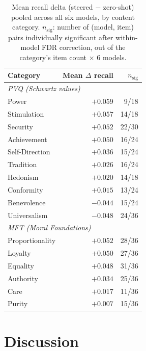 \begin{table}[t]
\centering
\caption{Mean recall delta (steered $-$ zero-shot) pooled across all six models, by
content category. $n_{\text{sig}}$: number of (model, item) pairs individually
significant after within-model FDR correction, out of the category's item count
$\times$ 6 models.}
\label{tab:category-patterns}
\begin{tabular}{lrr}
\toprule
Category & Mean $\Delta$ recall & $n_{\text{sig}}$ \\
\midrule
\multicolumn{3}{l}{\emph{PVQ (Schwartz values)}} \\
Power           & $+0.059$ & 9/18 \\
Stimulation     & $+0.057$ & 14/18 \\
Security        & $+0.052$ & 22/30 \\
Achievement     & $+0.050$ & 16/24 \\
Self-Direction  & $+0.036$ & 15/24 \\
Tradition       & $+0.026$ & 16/24 \\
Hedonism        & $+0.020$ & 14/18 \\
Conformity      & $+0.015$ & 13/24 \\
Benevolence     & $-0.044$ & 15/24 \\
Universalism    & $-0.048$ & 24/36 \\
\midrule
\multicolumn{3}{l}{\emph{MFT (Moral Foundations)}} \\
Proportionality & $+0.052$ & 28/36 \\
Loyalty         & $+0.050$ & 27/36 \\
Equality        & $+0.048$ & 31/36 \\
Authority       & $+0.034$ & 25/36 \\
Care            & $+0.017$ & 11/36 \\
Purity          & $+0.007$ & 15/36 \\
\bottomrule
\end{tabular}
\end{table}


\section{Discussion} \label{sec:discussion}

